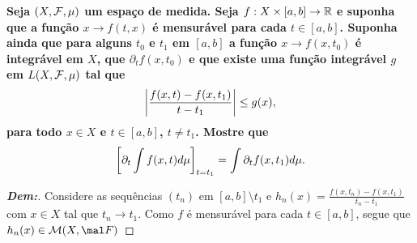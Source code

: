 \textbf{Seja $(X, \mathcal F, \mu)$ um espaço de medida. Seja 
$f: X \times [a, b] \rightarrow \mathbb R$ e suponha que a função $x \rightarrow f(t,x)$
é mensurável para cada $t \in [a, b]$. Suponha ainda que para alguns $t_0$ 
e $t_1$ em $[a, b]$ a função $x \rightarrow f(x, t_0)$ é integrável em $X$, 
que $\partial_t f(x, t_0)$ e que existe uma função integrável $g$ em 
$L(X, \mathcal F, \mu)$ tal que 
\begin{align*}
  \left|\frac{f(x, t) - f(x, t_1)}{t - t_1}\right| \le g(x),
\end{align*}
para todo $x \in X$ e $t \in [a, b]$, $t \neq t_1$. Mostre que 
\begin{align*}
  \left[\partial_t \int f(x, t) d\mu\right]_{t = t_1} = \int \partial_t f(x, t_1) d\mu.
\end{align*}}
\begin{proof}[\textbf{Dem:}]Considere as sequências $(t_n)$ em $[a, b]\setminus{t_1}$
  e $h_n(x) = \frac{f(x,t_n) - f(x, t_1)}{t_n-t_1}$ com $x \in X$ tal que 
  $t_n \rightarrow t_1$. Como $f$ é mensurável para cada $t \in [a,b]$, segue que 
  $h_n(x) \in \mathcal M(X, \mal F)$
\end{proof}
